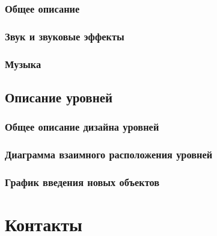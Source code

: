 \documentclass{article}
\begin{document}
\subsubsection{Общее описание}
\subsubsection{Звук и звуковые эффекты}
\subsubsection{Музыка}

\subsection{Описание уровней}
\subsubsection{Общее описание дизайна уровней}
\subsubsection{Диаграмма взаимного расположения уровней}
\subsubsection{График введения новых объектов}

\section{Контакты}

\newpage
\end{document}
